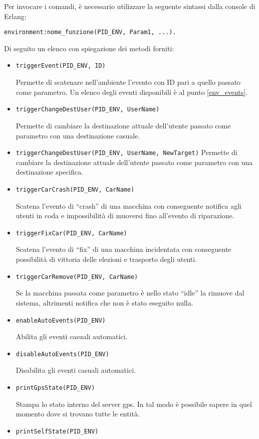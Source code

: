 Per invocare i comandi,  è necessario utilizzare la seguente sintassi dalla console di Erlang:
\begin{lstlisting}
environment:nome_funzione(PID_ENV, Param1, ...).
\end{lstlisting}
Di seguito un elenco con spiegazione dei metodi forniti:
\begin{itemize}
	\item \lstinline |triggerEvent(PID_ENV, ID)|

	Permette di scatenare nell'ambiente l'evento con ID pari a quello passato come parametro. Un elenco degli eventi disponibili è al punto \ref{env_events}.
	\item \lstinline |triggerChangeDestUser(PID_ENV, UserName)|
	
	Permette di cambiare la destinazione attuale dell'utente passato come parametro con una destinazione casuale.
	\item \lstinline |triggerChangeDestUser(PID_ENV, UserName, NewTarget)|
	Permette di cambiare la destinazione attuale dell'utente passato come parametro con una destinazione specifica.
	\item \lstinline |triggerCarCrash(PID_ENV, CarName)|
	
	Scatena l'evento di ``crash'' di una macchina con conseguente notifica agli utenti in coda e impossibilità di muoversi fino all'evento di riparazione.
	\item \lstinline |triggerFixCar(PID_ENV, CarName)|

	Scatena l'evento di ``fix'' di una macchina incidentata con conseguente possibilità di vittoria delle elezioni e trasporto degli utenti.
	\item \lstinline |triggerCarRemove(PID_ENV, CarName)|

	Se la macchina passata come parametro è nello stato ``idle'' la rimuove dal sistema, altrimenti notifica che non è stato eseguito nulla.
	\item \lstinline |enableAutoEvents(PID_ENV)|

	Abilita gli eventi casuali automatici.
	\item \lstinline |disableAutoEvents(PID_ENV)|

	Disabilita gli eventi casuali automatici.
	\item \lstinline |printGpsState(PID_ENV)|
	
	Stampa lo stato interno del server gps. In tal modo è possibile sapere in quel momento dove si trovano tutte le entità.
	\item \lstinline |printSelfState(PID_ENV)|


\end{itemize}
